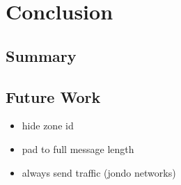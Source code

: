 \chapter{Conclusion}
\label{concl}

\section{Summary}
\label{ssummary}

\section{Future Work}
\label{sfuture}

\begin{itemize}
    \item hide zone id
    \item pad to full message length
    \item always send traffic (jondo networks)
\end{itemize}
 